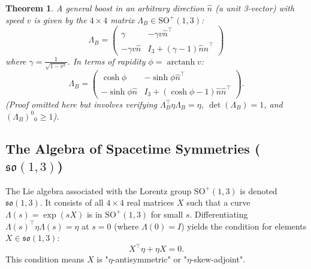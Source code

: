 \documentclass{amsart}
\newtheorem{theorem}{Theorem}[section]
\theoremstyle{definition}
\theoremstyle{remark}
\DeclareMathOperator{\arctanh}{arctanh}
\begin{document}
\begin{theorem}\label{thm:general_boost_so13}
  A general boost in an arbitrary direction $\hat{n}$ (a unit 3-vector) with speed $v$ is given by the $4 \times 4$ matrix $\Lambda_B \in \mathrm{SO}^+(1,3)$:
  \begin{equation*}
    \Lambda_B =
    \begin{pmatrix}
      \gamma & -\gamma v \hat{n}^\top \\
      -\gamma v \hat{n} & I_3 + \left(\gamma-1\right)\hat{n}\hat{n}^\top
    \end{pmatrix}
  \end{equation*}
  where $\gamma=\frac{1}{\sqrt{1-v^2}}$. In terms of rapidity $\phi=\arctanh v$:
  \begin{equation*}
    \Lambda_B =
    \begin{pmatrix}
      \cosh \phi & -\sinh \phi \hat{n}^\top \\
      -\sinh \phi \hat{n} & I_3 + (\cosh \phi - 1) \hat{n} \hat{n}^\top
    \end{pmatrix}.
  \end{equation*}
  (Proof omitted here but involves verifying $\Lambda_B^\top \eta \Lambda_B = \eta$, $\det(\Lambda_B)=1$, and $(\Lambda_B)^0{}_0 \ge 1$).
\end{theorem}

\subsection{The Algebra of Spacetime Symmetries ($\mathfrak{so}(1,3)$)}
\label{subsec:so13_algebra}
The Lie algebra associated with the Lorentz group $\mathrm{SO}^+(1,3)$ is denoted $\mathfrak{so}(1,3)$. It consists of all \(4 \times 4\) real matrices \(X\) such that a curve $\Lambda(s) = \exp(sX)$ is in $\mathrm{SO}^+(1,3)$ for small $s$. Differentiating $\Lambda(s)^\top \eta \Lambda(s) = \eta$ at $s=0$ (where $\Lambda(0)=I$) yields the condition for elements $X \in \mathfrak{so}(1,3)$:
\begin{equation*}
  X^\top \eta + \eta X = 0.
\end{equation*}
This condition means $X$ is "$\eta$-antisymmetric" or "$\eta$-skew-adjoint".
\end{document}
